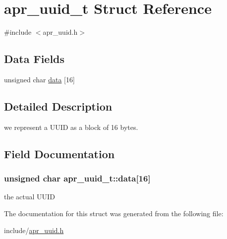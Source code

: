 \hypertarget{structapr__uuid__t}{\section{apr\-\_\-uuid\-\_\-t Struct Reference}
\label{structapr__uuid__t}
}


{\ttfamily \#include $<$apr\-\_\-uuid.\-h$>$}

\subsection*{Data Fields}
\begin{DoxyCompactItemize}
\item 
unsigned char \hyperlink{structapr__uuid__t_a8e3dadfe1bd9cbf26478127c4110e0d0}{data} \mbox{[}16\mbox{]}
\end{DoxyCompactItemize}


\subsection{Detailed Description}
we represent a U\-U\-I\-D as a block of 16 bytes. 

\subsection{Field Documentation}
\hypertarget{structapr__uuid__t_a8e3dadfe1bd9cbf26478127c4110e0d0}{
\subsubsection[{data}]{\setlength{\rightskip}{0pt plus 5cm}unsigned char apr\-\_\-uuid\-\_\-t\-::data\mbox{[}16\mbox{]}}}\label{structapr__uuid__t_a8e3dadfe1bd9cbf26478127c4110e0d0}
the actual U\-U\-I\-D 

The documentation for this struct was generated from the following file\-:\begin{DoxyCompactItemize}
\item 
include/\hyperlink{apr__uuid_8h}{apr\-\_\-uuid.\-h}\end{DoxyCompactItemize}
